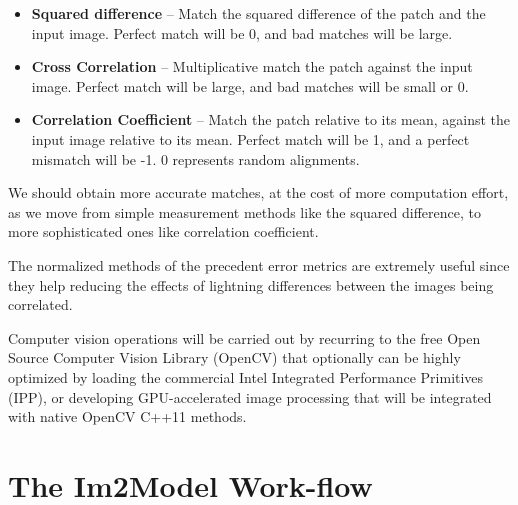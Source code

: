 \documentclass[
  oneside,
  11pt, a4paper,
  footinclude=true,
  headinclude=true,
  cleardoublepage=empty
]{scrbook}
\begin{document}
	\begin{itemize}
	    \item \textbf{Squared difference} -- Match the squared difference of the patch and the input image.
			Perfect match will be 0, and bad matches will be large.
	     \item \textbf{Cross Correlation} -- Multiplicative match the patch against the input image.
			Perfect match will be large, and bad matches will be small or 0.
			
	     \item \textbf{Correlation Coefficient} -- Match the patch relative to its mean, against the input image relative to its mean.
			Perfect match will be 1, and a perfect mismatch will be -1. 0 represents random alignments.
	\end{itemize}
				

We should obtain more accurate matches, at the cost of more computation effort, as we move from simple measurement methods like the squared difference, to more sophisticated ones like correlation coefficient.\par
The normalized methods of the precedent error metrics are extremely useful since they help reducing the effects of lightning differences between the images being correlated.\par 


Computer vision operations will be carried out by recurring to the free Open Source Computer Vision Library (OpenCV) that optionally can be highly optimized by loading the commercial Intel Integrated Performance Primitives (IPP)\citep{ˆome2004programming}, or developing GPU-accelerated image processing that will be integrated with native OpenCV C++11 methods.




\section{The Im2Model Work-flow}
\end{document}
